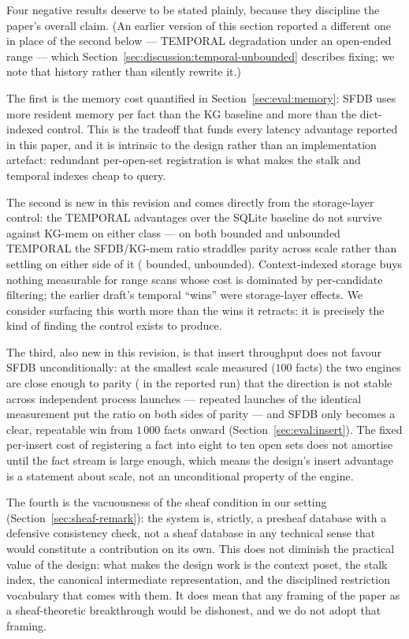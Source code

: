 Four negative results deserve to be stated plainly, because they
discipline the paper's overall claim. (An earlier version of this
section reported a different one in place of the second below --- TEMPORAL
degradation under an
open-ended range --- which Section~\ref{sec:discussion:temporal-unbounded}
describes fixing; we note that history rather than silently rewrite it.)

The first is the memory cost
quantified in Section~\ref{sec:eval:memory}: SFDB uses \rangememkg{}
more resident memory per fact than the KG baseline and \rangememkgmem{}
more than the dict-indexed control. This is the tradeoff
that funds every latency advantage reported in this paper, and it is
intrinsic to the design rather than an implementation artefact: redundant
per-open-set registration is what makes the stalk and temporal indexes
cheap to query.

The second is new in this revision and comes directly from the
storage-layer control: the TEMPORAL advantages over the SQLite baseline
do not survive against KG-mem on either class --- on both bounded and
unbounded TEMPORAL the SFDB/KG-mem ratio straddles parity across scale
rather than settling on either side of it
(\rangetemporalkgmem{} bounded, \rangetemporalunbkgmem{} unbounded).
Context-indexed storage buys nothing measurable for range scans whose
cost is dominated by per-candidate filtering; the earlier draft's
temporal ``wins'' were storage-layer effects. We consider surfacing this
worth more than the wins it retracts: it is precisely the kind of
finding the control exists to produce.

The third, also new in this revision, is that insert throughput does not
favour SFDB unconditionally: at the smallest scale measured ($100$
facts) the two engines are close enough to parity
(\insertkgsmallestscale{} in the reported run) that the direction is
not stable across independent process launches --- repeated launches of
the identical measurement put the ratio on both sides of parity --- and
SFDB only becomes a clear, repeatable win from $1\,000$ facts onward
(Section~\ref{sec:eval:insert}). The fixed per-insert cost of registering
a fact into eight to ten open sets does not amortise until the fact
stream is large enough, which means the design's insert advantage is a
statement about scale, not an unconditional property of the engine.

The fourth is the vacuousness of the sheaf condition in our setting
(Section~\ref{sec:sheaf-remark}): the system is, strictly, a presheaf
database with a defensive consistency check, not a sheaf database in any
technical sense that would constitute a contribution on its own. This does
not diminish the practical value of the design: what makes the design work
is the context poset, the stalk index, the canonical intermediate
representation, and the disciplined restriction vocabulary that comes with
them. It does mean that any framing of the paper
as a sheaf-theoretic breakthrough would be dishonest, and we do not adopt
that framing.
